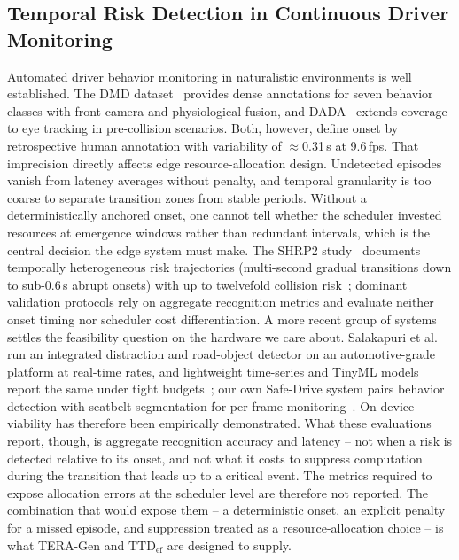 \documentclass[a4paper,fleqn]{cas-dc}
\newcommand{\TERAGen}{\mbox{TERA-Gen}\xspace}
\begin{document}
\subsection{Temporal Risk Detection in Continuous Driver Monitoring}
\label{sec:rel_dms}
Automated driver behavior monitoring in naturalistic environments is well
established. The DMD dataset~\cite{ortega2020dmd} provides dense annotations
for seven behavior classes with front-camera and physiological fusion, and
DADA~\cite{fang2022dada} extends coverage to eye tracking in pre-collision
scenarios. Both, however, define onset by retrospective human annotation with
variability of $\approx$0.31\,s at 9.6\,fps.
That imprecision directly affects edge resource-allocation design. Undetected
episodes vanish from latency averages without penalty, and temporal granularity
is too coarse to separate transition zones from stable periods. Without a
deterministically anchored onset, one cannot tell whether the scheduler
invested resources at emergence windows rather than redundant intervals, which
is the central decision the edge system must make.
The SHRP2 study~\cite{dingus2016shrp2} documents temporally heterogeneous risk trajectories (multi-second gradual transitions down to sub-0.6\,s abrupt onsets) with up to twelvefold collision risk~\cite{bouhsissin2023driver}; dominant validation protocols rely on aggregate recognition metrics and evaluate neither onset timing nor scheduler cost differentiation.
A more recent group of systems settles the feasibility question on the hardware we
care about. Salakapuri et al.~\cite{salakapuri2025integrated} run an integrated
distraction and road-object detector on an automotive-grade platform at real-time
rates, and lightweight time-series and TinyML models report the same under tight
budgets~\cite{fresta2025cognitive,tinydl2025driverstate}; our own Safe-Drive system
pairs behavior detection with seatbelt segmentation for per-frame
monitoring~\cite{albarello2025safedrive}. On-device viability has therefore been empirically demonstrated. What these evaluations report, though, is aggregate recognition accuracy and
latency -- not when a risk is detected relative to its onset, and not what it costs
to suppress computation during the transition that leads up to a critical event. The metrics required to expose allocation errors at the scheduler level are therefore not reported. The combination that would expose them -- a deterministic onset, an explicit
penalty for a missed episode, and suppression treated as a resource-allocation
choice -- is what \TERAGen and $\mathrm{TTD}_{\mathrm{ef}}$ are designed to supply.
\end{document}
